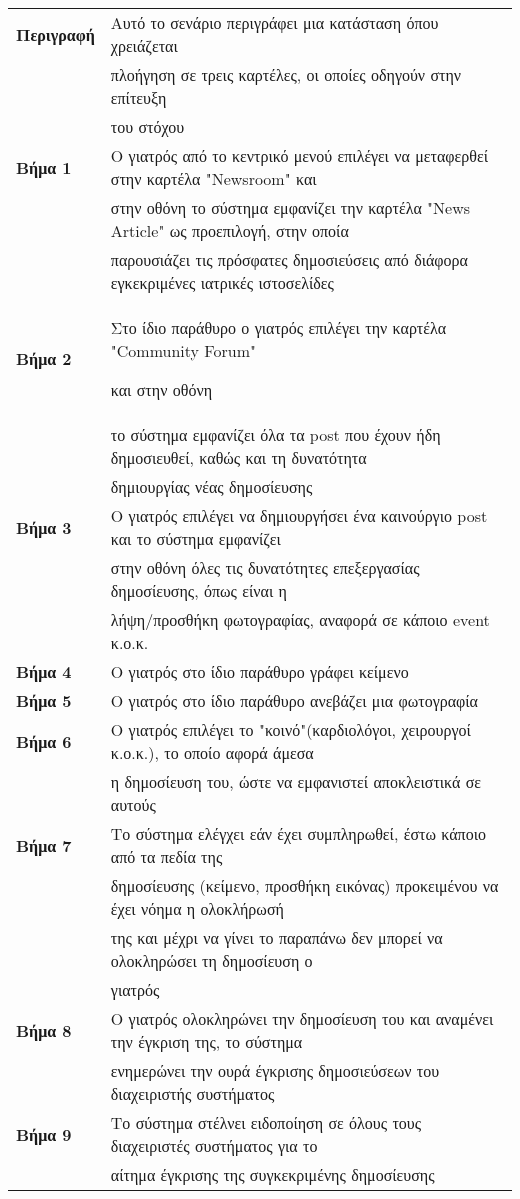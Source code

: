 \documentclass{article}
\newcommand\T{\rule{0pt}{2.6ex}}       %
\newcommand\B{\rule[-1.2ex]{0pt}{0pt}}
\begin{document}
 \begin{center}
     \begin{tabular}{|l|l|}
     \hline
      \textbf{Περιγραφή} & Αυτό το σενάριο περιγράφει μια κατάσταση όπου χρειάζεται \T \\& πλοήγηση σε τρεις καρτέλες, οι οποίες οδηγούν στην επίτευξη \\& του στόχου \B \\ 
      \hline
      \textbf{Βήμα 1} & Ο γιατρός από το κεντρικό μενού επιλέγει να μεταφερθεί στην καρτέλα "Newsroom" και\T \\& στην οθόνη  το σύστημα εμφανίζει την καρτέλα "News Article" ως προεπιλογή, στην οποία \\&      παρουσιάζει τις πρόσφατες δημοσιεύσεις από διάφορα εγκεκριμένες ιατρικές ιστοσελίδες \B \\
      \hline
      \textbf{Βήμα 2} & Στο ίδιο παράθυρο ο γιατρός επιλέγει την καρτέλα "Community Forum" \T και στην οθόνη \\& το σύστημα εμφανίζει όλα τα post που έχουν ήδη δημοσιευθεί, καθώς  και τη δυνατότητα \\& δημιουργίας νέας δημοσίευσης \B \\
      \hline
      \textbf{Βήμα 3} & Ο γιατρός επιλέγει να δημιουργήσει ένα καινούργιο post και το σύστημα εμφανίζει \T \\&  στην οθόνη όλες τις δυνατότητες επεξεργασίας δημοσίευσης, όπως είναι η \\& λήψη/προσθήκη φωτογραφίας,  αναφορά σε κάποιο event κ.ο.κ. \B \\
      \hline
      \textbf{Βήμα 4} & Ο γιατρός στο ίδιο παράθυρο γράφει κείμενο \T\B \\
      \hline
      \textbf{Βήμα 5} & Ο γιατρός στο ίδιο παράθυρο ανεβάζει μια φωτογραφία  \T\B \\
      \hline
      \textbf{Βήμα 6} & Ο γιατρός επιλέγει το "κοινό"(καρδιολόγοι, χειρουργοί κ.ο.κ.), το οποίο αφορά άμεσα\T \\& η δημοσίευση του, ώστε να εμφανιστεί αποκλειστικά σε αυτούς \B \\
      \hline
      \textbf{Βήμα 7} & Το σύστημα ελέγχει εάν έχει συμπληρωθεί, έστω κάποιο από τα πεδία της \T\\& δημοσίευσης (κείμενο, προσθήκη εικόνας) προκειμένου να έχει νόημα η ολοκλήρωσή \\& της και μέχρι να γίνει το παραπάνω δεν μπορεί να ολοκληρώσει τη δημοσίευση ο \\&
      γιατρός \B \\
      \hline
      \textbf{Βήμα 8} & Ο γιατρός ολοκληρώνει την δημοσίευση του και αναμένει την έγκριση της, το σύστημα \T \\&  ενημερώνει την ουρά έγκρισης δημοσιεύσεων του διαχειριστής συστήματος  \B \\
      \hline     
      \textbf{Βήμα 9} & Το σύστημα στέλνει ειδοποίηση σε όλους τους διαχειριστές συστήματος για το \T \\& αίτημα έγκρισης της συγκεκριμένης δημοσίευσης \B \\
      \hline 
     \end{tabular}
 \end{center}
 
\end{document}
